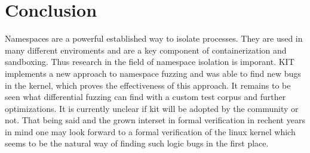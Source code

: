 \documentclass[10pt,twocolumn,a4paper]{article}
\begin{document}
\section{Conclusion}
Namespaces are a powerful established way to isolate processes. They are used in many different enviroments 
and are a key component of containerization and sandboxing. Thus research in the field of namespace isolation is
imporant. KIT implements a new approach to namespace fuzzing and was able to find new bugs in the
kernel, which proves the effectiveness of this approach. It remains to be seen what differential
fuzzing can find with a custom  test corpus and further optimizations. It is currently unclear if
kit will be adopted by the community or not. That being said and the  grown interset in formal
verification in rechent years in mind one may look forward to a formal verification of the linux
kernel which seems to be the natural way of finding such logic bugs in the first place.


\end{document}
